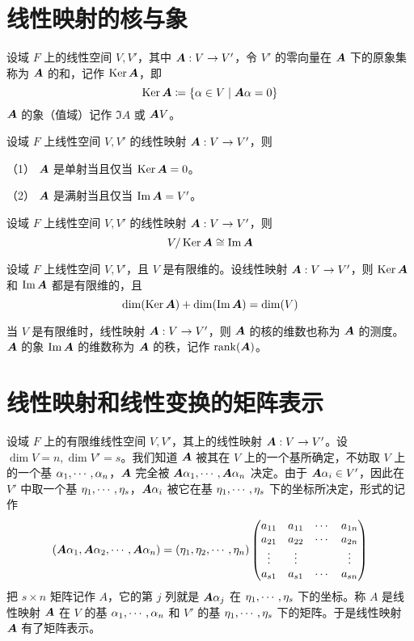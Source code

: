 \section{线性映射的核与象}

\begin{definition}[核] 
    设域 $F$ 上的线性空间 $V,V'$，其中 $\boldsymbol{A} : V \to V'$，令 $V'$ 的零向量在 $\boldsymbol{A}$ 下的原象集称为 $\boldsymbol{A}$ 的和，记作 $\operatorname{Ker} \boldsymbol{A}$，即
    \[ \operatorname{Ker} \boldsymbol{A} \coloneqq \{ \alpha \in V \mid \boldsymbol{A}\alpha = 0 \} \]
    $\boldsymbol{A}$ 的象（值域）记作 $\Im A$ 或 $\boldsymbol{A} V$。
\end{definition}

\begin{proposition}
    设域 $F$ 上线性空间 $V,V'$ 的线性映射 $\boldsymbol{A} : V \to V'$，则
    
    （1） $\boldsymbol{A}$ 是单射当且仅当 $\operatorname{Ker} \boldsymbol{A} = 0$。

    （2） $\boldsymbol{A}$ 是满射当且仅当 $\operatorname{Im} \boldsymbol{A} = V'$。
\end{proposition}

\begin{theorem}
    设域 $F$ 上线性空间 $V,V'$ 的线性映射 $\boldsymbol{A} : V \to V'$，则
    \[ V / \operatorname{Ker} \boldsymbol{A} \cong \operatorname{Im} \boldsymbol{A} \]
\end{theorem}

\begin{theorem}
    设域 $F$ 上线性空间 $V,V'$，且 $V$ 是有限维的。设线性映射 $\boldsymbol{A} : V \to V'$，则 $\operatorname{Ker} \boldsymbol{A}$ 和 $\operatorname{Im} \boldsymbol{A}$ 都是有限维的，且
    \[ \dim(\operatorname{Ker} \boldsymbol{A}) + \dim(\operatorname{Im} \boldsymbol{A}) = \dim(V) \]
\end{theorem}

当 $V$ 是有限维时，线性映射 $\boldsymbol{A} : V \to V'$，则 $\boldsymbol{A}$ 的核的维数也称为 $\boldsymbol{A}$ 的测度。$\boldsymbol{A}$ 的象 $\operatorname{Im} \boldsymbol{A}$ 的维数称为 $\boldsymbol{A}$ 的秩，记作 $\operatorname{rank}(\boldsymbol{A})$。

\section{线性映射和线性变换的矩阵表示}

设域 $F$ 上的有限维线性空间 $V,V'$，其上的线性映射 $\boldsymbol{A} : V \to V'$。设 $\dim V = n,\dim V' = s$。我们知道 $\boldsymbol{A}$ 被其在 $V$ 上的一个基所确定，不妨取 $V$ 上的一个基 $\alpha_1,\cdots,\alpha_n$，$\boldsymbol{A}$ 完全被 $\boldsymbol{A} \alpha_1,\cdots,\boldsymbol{A} \alpha_n$ 决定。由于 $\boldsymbol{A} \alpha_i \in V'$，因此在 $V'$ 中取一个基 $\eta_1,\cdots,\eta_s$，$\boldsymbol{A} \alpha_i$ 被它在基 $\eta_1,\cdots,\eta_s$ 下的坐标所决定，形式的记作
\[ 
    \left( \boldsymbol{A} \alpha_1 , \boldsymbol{A} \alpha_2 , \cdots , \boldsymbol{A} \alpha_n \right) = 
    \left( \eta_1 , \eta_2 , \cdots , \eta_n \right)
    \left( \begin{matrix}
        a_{11} & a_{11} & \cdots & a_{1n}\\
        a_{21} & a_{22} & \cdots & a_{2n}\\
        \vdots & \vdots &        & \vdots\\
        a_{s1} & a_{s1} & \cdots & a_{sn}
    \end{matrix} \right)
\]
把 $s\times n$ 矩阵记作 $A$，它的第 $j$ 列就是 $\boldsymbol{A} \alpha_j$ 在 $\eta_1,\cdots,\eta_s$ 下的坐标。称 $A$ 是线性映射 $\boldsymbol{A}$ 在 $V$ 的基 $\alpha_1,\cdots,\alpha_n$ 和 $V'$ 的基 $\eta_1,\cdots,\eta_s$ 下的矩阵。于是线性映射 $\boldsymbol{A}$ 有了矩阵表示。

